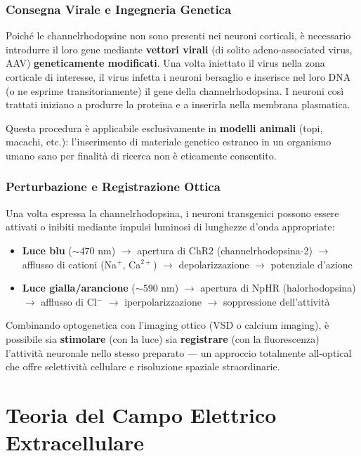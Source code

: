 \subsubsection{Consegna Virale e Ingegneria Genetica}

Poiché le channelrhodopsine non sono presenti nei neuroni corticali, è necessario introdurre il loro gene mediante \textbf{vettori virali} (di solito adeno-associated virus, AAV) \textbf{geneticamente modificati}. Una volta iniettato il virus nella zona corticale di interesse, il virus infetta i neuroni bersaglio e inserisce nel loro DNA (o ne esprime transitoriamente) il gene della channelrhodopsina. I neuroni così trattati iniziano a produrre la proteina e a inserirla nella membrana plasmatica.

Questa procedura è applicabile esclusivamente in \textbf{modelli animali} (topi, macachi, etc.): l'inserimento di materiale genetico estraneo in un organismo umano sano per finalità di ricerca non è eticamente consentito.

\subsubsection{Perturbazione e Registrazione Ottica}

Una volta espressa la channelrhodopsina, i neuroni transgenici possono essere attivati o inibiti mediante impulsi luminosi di lunghezze d'onda appropriate:

\begin{itemize}
    \item \textbf{Luce blu} ($\sim 470$ nm) $\rightarrow$ apertura di ChR2 (channelrhodopsina-2) $\rightarrow$ afflusso di cationi (Na$^+$, Ca$^{2+}$) $\rightarrow$ depolarizzazione $\rightarrow$ potenziale d'azione
    \item \textbf{Luce gialla/arancione} ($\sim 590$ nm) $\rightarrow$ apertura di NpHR (halorhodopsina) $\rightarrow$ afflusso di Cl$^-$ $\rightarrow$ iperpolarizzazione $\rightarrow$ soppressione dell'attività
\end{itemize}

Combinando optogenetica con l'imaging ottico (VSD o calcium imaging), è possibile sia \textbf{stimolare} (con la luce) sia \textbf{registrare} (con la fluorescenza) l'attività neuronale nello stesso preparato — un approccio totalmente all-optical che offre selettività cellulare e risoluzione spaziale straordinarie.

\newpage

\section{Teoria del Campo Elettrico Extracellulare}

